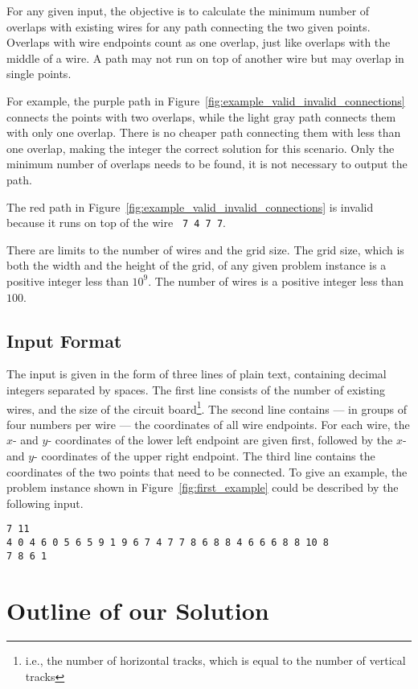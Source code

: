\documentclass[sigconf,nonacm,screen]{acmart}
\begin{document}
For any given input, the objective is to calculate the minimum number of overlaps with existing wires for any path connecting the two given points. Overlaps with wire endpoints count as one overlap, just like overlaps with the middle of a wire. A path may not run on top of another wire but may overlap in single points.


For example, the purple path in Figure~\ref{fig:example_valid_invalid_connections} connects the points with two overlaps, while the light gray path connects them with only one overlap. There is no cheaper path connecting them with less than one overlap, making the integer  the correct solution for this scenario. Only the minimum number of overlaps needs to be found, it is not necessary to output the path.

The red path in Figure~\ref{fig:example_valid_invalid_connections} is invalid because it runs on top of the wire \texttt{~7~4~7~7}.

There are limits to the number of wires and the grid size.
The grid size, which is both the width and the height of the grid, of any given problem instance is a positive integer less than $10^{9}$. The number of wires is a positive integer less than $100$.

\subsection{Input Format}
The input is given in the form of three lines of plain text, containing decimal integers separated by spaces. The first line consists of the number of existing wires, and the size of the circuit board\footnote{i.e., the number of horizontal tracks, which is equal to the number of vertical tracks}. The second line contains --- in groups of four numbers per wire --- the coordinates of all wire endpoints. For each wire, the $x$- and $y$- coordinates of the lower left endpoint are given first, followed by the  $x$- and $y$- coordinates of the upper right endpoint. The third line contains the coordinates of the two points that need to be connected. To give an example, the problem instance shown in Figure~\ref{fig:first_example} could be described by the following input.
\begin{verbatim}
7 11
4 0 4 6 0 5 6 5 9 1 9 6 7 4 7 7 8 6 8 8 4 6 6 6 8 8 10 8
7 8 6 1
\end{verbatim}

\section{Outline of our Solution}
\end{document}
